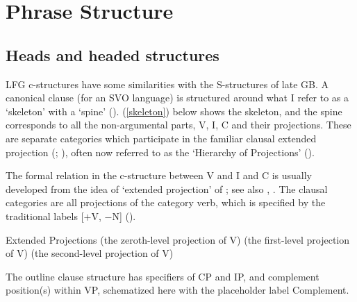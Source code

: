 \documentclass[output=paper,hidelinks]{langscibook}
\begin{document}
\section{Phrase Structure}
\label{sec:minimalism:ps}
\largerpage[2]
\subsection{Heads and headed structures}
\label{sec:minimalism:heads}

LFG c-structures have some similarities with the S-structures of late
GB. A canonical clause (for an SVO language) is structured around
what I refer to as a `skeleton' with a `spine'
(\citealp[17]{sellssao}). (\ref{skeleton}) below shows the skeleton,
and the spine corresponds to all the non-argumental parts, V, I, C and
their projections. These are separate categories which participate in
the familiar clausal extended projection
(\citealp[116ff.]{grimshaw00ep}; \citealp[100]{bresnan2001lexical}),
often now referred to as the `Hierarchy of Projections'
(\citealp{adger03}).

The formal relation in the c-structure between V and I and C is
usually developed from the idea of `extended projection' of
\citet{grimshaw00ep}; see also \citet[100--101]{bresnan2001lexical},
\citet[103]{BresnanEtAl2016}. The clausal categories are all
projections of the category verb, which is specified by the
traditional labels [$+$V, $-$N] (\citealp{chomsky1970remarks}).
  
\ea\label{ext-proj}
Extended Projections
\ea
{}\makebox[1em][l]{=}\makebox[7em][l]{[$+$V, $-$N, P0]} (the zeroth-level projection
of V) 
\ex
{}\makebox[1em][l]{=}\makebox[7em][l]{[$+$V, $-$N, P1]} (the first-level
projection of V) 
\ex
{}\makebox[1em][l]{=}\makebox[7em][l]{[$+$V, $-$N, P2]} (the second-level projection
of V) 
\z\z

The outline clause structure has specifiers of CP and IP, and
complement position(s) within VP, schematized here with the
placeholder label Complement.
\end{document}

